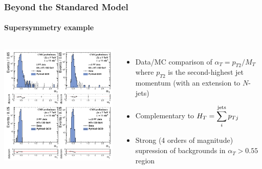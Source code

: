 \documentclass[compress]{beamer}
\newcommand{\s}[1]{{\mbox{\scriptsize #1}}}
\begin{document}
\begin{frame}
\frametitle{Beyond the Standared Model}
\framesubtitle{Supersymmetry example}

\begin{columns}
\includegraphics[width=\linewidth]{susy_example.png}
\begin{itemize}
\item Data/MC comparison of $\alpha_T = p_{T2}/M_T$ where $p_{T2}$ is the second-highest jet momentum (with an extension to $N$-jets)

\item Complementary to $\displaystyle H_T = \sum_i^\s{jets} p_{Tj}$

\item Strong (4 orders of magnitude) supression of backgrounds in $\alpha_T > 0.55$ region
\end{itemize}
\end{columns}

\vspace{-0.3 cm}
\begin{tabular}{p{\linewidth}}
\\\hline
\end{tabular}


\end{frame}
\end{document}
